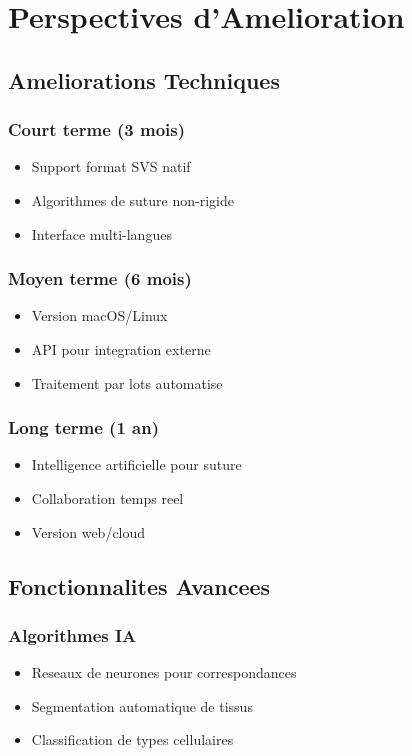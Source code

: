 \documentclass[12pt,a4paper]{article}
\begin{document}
\section{Perspectives d'Amelioration}

\subsection{Ameliorations Techniques}

\subsubsection{Court terme (3 mois)}
\begin{itemize}
\item Support format SVS natif
\item Algorithmes de suture non-rigide
\item Interface multi-langues
\end{itemize}

\subsubsection{Moyen terme (6 mois)}
\begin{itemize}
\item Version macOS/Linux
\item API pour integration externe
\item Traitement par lots automatise
\end{itemize}

\subsubsection{Long terme (1 an)}
\begin{itemize}
\item Intelligence artificielle pour suture
\item Collaboration temps reel
\item Version web/cloud
\end{itemize}

\subsection{Fonctionnalites Avancees}

\subsubsection{Algorithmes IA}
\begin{itemize}
\item Reseaux de neurones pour correspondances
\item Segmentation automatique de tissus
\item Classification de types cellulaires
\end{itemize}
\end{document}
